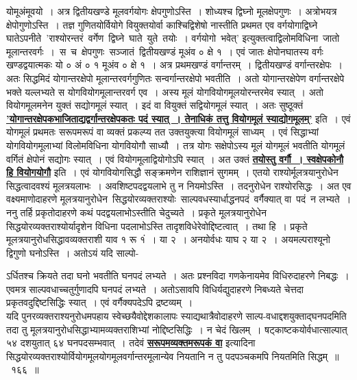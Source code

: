 \documentclass[11pt, openany]{book}
\begin{document}
योमूअंमूवयो~। अत्र द्वितीयखण्डे मूलवर्गयोगः क्षेपगुणोऽस्ति~। शोध्यश्च द्विघ्नो मूलक्षेपगुणः~। अत्रोभयत्र क्षेपोगुणोऽस्ति~। तज्ञ गुणितयोर्वियोगे
वियुक्तयोर्वा काश्चिद्विशेषो नास्तीति प्रथमत एव वर्गयोगाद्विघ्ने \,घातेऽपनीते \,{\qt 'राश्योरन्तरं \,वर्गेण \,द्विघ्ने \,घाते \,युते \,तयोः~। वर्गयोगो \,भवेत्'} इत्युक्तत्वाद्विलोमविधिना \,जातो \,मूलान्तरवर्गः~। \,स \,च \,क्षेपगुणः \,सञ्जातं \,द्वितीयखण्डं मूअंव ० क्षे १~।
एवं जातः
क्षेपोनघातस्य वर्गः खण्डद्वयात्मकः यो ० अं ० १ मूअंव ० क्षे १~। अत्र
प्रथमखण्डं
वर्गान्तरम्~। द्वितीयखण्डं वर्गान्तरक्षेपः~। अतः सिद्धमिदं
योगान्तरक्षेपो मूलान्तरवर्गगुणितः सन्वर्गान्तरक्षेपो भवतीति~। अतो योगान्तरक्षेपेण
वर्गान्तरक्षेपे भक्ते
यल्लभ्यते स योगवियोगमूलान्तरवर्ग एव~। अस्य मूलं योगवियोगमूलयोरन्तरमेव
स्यात्~। अतो वियोगमूलमनेन युक्तं सद्योगमूलं स्यात्~। इदं वा वियुक्तं
सद्वियोगमूलं स्यात्~। अतः सुष्ठूक्तं \hyperref[166]{\textbf{'योगान्तरक्षेपकभाजिताद्यद्वर्गान्तरक्षेपकतः पदं
स्यात्~। तेनाधिकं तत्तु वियोगमूलं स्याद्योगमूलम्'}} इति~। एवं योगमूलं
प्रथमतः सरूपमरूपं वा व्यक्तं प्रकल्प्य तत उक्तयुक्त्या वियोगमूलं
साध्यम्~। एवं सिद्धाभ्यां योगवियोगमूलाभ्यां विलोमविधिना योगवियोगौ साध्यौ~।
तत्र योगः सक्षेपोऽस्य मूलं योगमूलं भवतीति योगमूलं वर्गितं क्षेपोनं सद्योगः स्यात्~।
एवं वियोगमूलाद्वियोगोऽपि स्यात्~। अत उक्तं \hyperref[166]{\textbf{तयोस्तु वर्गौ~। स्वक्षेपकोनौ हि
वियोगयोगौ}} इति~। एवं योगवियोगसिद्धौ सङ्क्रमणेन राशिज्ञानं सुगमम्~। एतयो
राश्योर्मूलत्रयानुरोधेन सिद्धत्वादवश्यं मूलत्रयलाभः~। अवशिष्टपदद्वयलाभे
तु न नियमोऽस्ति~। तदनुरोधेन राश्योरसिद्धः~। अत एव वक्ष्यमाणोदाहरणे मूलत्रयानुरोधेन \,सिद्धयोरव्यक्तराश्योः \,साल्पवधस्यार्धाद्धनपदं \,वर्गैक्यात् वा \,पदं \,न लभ्यते~।\\

 \vspace{-4mm}
 ननु तर्हि प्रकृतोदाहरणे कथं पदद्वयलाभोऽस्तीति चेदुच्यते~। प्रकृते
मूलत्रयानुरोधेन सिद्धयोरव्यक्तराश्योर्यादृशेन विधिना पदलाभोऽस्ति
तादृशविधेरेवोद्दिष्टत्वात्~। तथा हि~। प्रकृते मूलत्रयानुरोधसिद्धावव्यक्तराशी याव १ रू
१ं~। या २~। अनयोर्वधः याघ २ या २~। अयमल्पराश्यूनो द्विगुणो घनोऽस्ति~। अतोऽयं यदि साल्पो-

\newpage%
\noindent ऽर्धितश्च क्रियते तदा घनो भवतीति घनपदं लभ्यते~। अतः प्रश्नविदा
गणकेनायमेव विधिरुदाहरणे निबद्धः~। एवमत्र साल्पवधाच्चतुर्गुणादपि घनपदं लभ्यते~।
अतोऽसावपि विधिर्यद्युदाहरणे निबध्यते चेत्तदा प्रकृतवदुद्दिष्टसिद्धिः स्यात्~। एवं
वर्गैक्यपदेऽपि द्रष्टव्यम्~।\\

\vspace{-4mm}
 यदि पुनरव्यक्तराश्यनुरोधमपहाय स्वेच्छयैवोद्देशकालापः स्याद्यथात्रैवोदाहरणे
 साल्प-वधाद्दशयुक्ताद्घनपदमिति तदा तु मूलत्रयानुरोधसिद्धाभ्यामव्यक्तराशिभ्यां नोद्दिष्टसिद्धिः~। न चेदं खिलम्~। षट्काष्टकयोर्वधात्साल्पात् ५४
दशयुतात् ६४ घनपदसम्भवात्~। तदेवं \hyperref[166]{\textbf{सरूपमव्यक्तमरूपकं वा}} इत्यादिना
सिद्धयोरव्यक्तराश्योर्वियोगमूलयोगमूलवर्गान्तरमूलान्येव नियतानि न तु पदपञ्चकमपि नियतमिति सिद्धम्~॥~१६६~॥~\\
\end{document}
